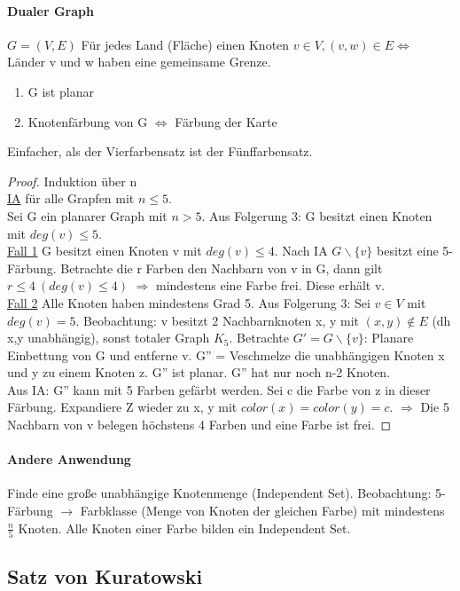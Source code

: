 \paragraph{Dualer Graph} $ G=(V,E) $ Für jedes Land (Fläche) einen Knoten $ v \in V, (v,w) \in E \Leftrightarrow $ Länder v und w haben eine gemeinsame Grenze.
\begin{enumerate}
    \item G ist planar
    \item Knotenfärbung von G $ \Leftrightarrow $ Färbung der Karte
\end{enumerate}
Einfacher, als der Vierfarbensatz ist der Fünffarbensatz.
\begin{proof}
Induktion über n \\
\underline{IA} für alle Grapfen mit $ n \leq 5 $. \\
Sei G ein planarer Graph mit $ n > 5 $. Aus Folgerung 3: G besitzt einen Knoten mit $ deg(v) \leq 5 $.\\
\underline{Fall 1} G besitzt einen Knoten v mit $ deg(v) \leq 4 $. Nach IA $ G \backslash \{ v \} $ besitzt eine 5-Färbung. Betrachte die r Farben den Nachbarn von v in G, dann gilt $ r \leq 4\ (deg(v) \leq 4) $ $ \Rightarrow $ mindestens eine Farbe frei. Diese erhält v. \\
\underline{Fall 2} Alle Knoten haben mindestens Grad 5. Aus Folgerung 3: Sei $ v\in V $ mit $ deg(v) = 5 $. Beobachtung: v besitzt 2 Nachbarnknoten x, y mit $ (x,y) \notin E $ (dh x,y unabhängig), sonst totaler Graph $ K_5 $. Betrachte $ G' = G\backslash\{v \} $: Planare Einbettung von G und entferne v. G'' = Veschmelze die unabhängigen Knoten x und y zu einem Knoten z. G'' ist planar. G'' hat nur noch n-2 Knoten.\\
Aus IA: G'' kann mit 5 Farben gefärbt werden. Sei c die Farbe von z in dieser Färbung. Expandiere Z wieder zu x, y mit $ color(x)=color(y)=c $. $ \Rightarrow $ Die 5 Nachbarn von v belegen höchstens 4 Farben und eine Farbe ist frei.
\end{proof}
\paragraph{Andere Anwendung} Finde eine große unabhängige Knotenmenge (Independent Set). Beobachtung: 5-Färbung $ \rightarrow $ Farbklasse  (Menge von Knoten der gleichen Farbe) mit mindestens $ \frac{n}{5} $ Knoten. Alle Knoten einer Farbe bilden ein Independent Set.


\subsection{Satz von Kuratowski}
